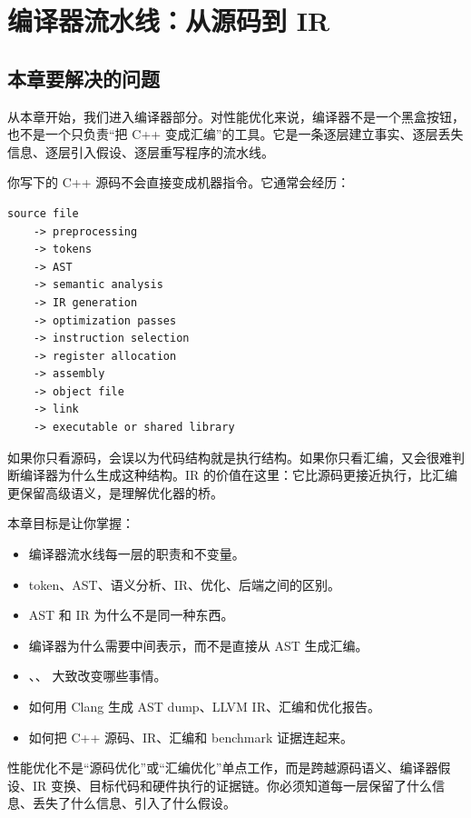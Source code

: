 \section{编译器流水线：从源码到 IR}

\subsection{本章要解决的问题}

从本章开始，我们进入编译器部分。对性能优化来说，编译器不是一个黑盒按钮，也不是一个只负责“把 C++ 变成汇编”的工具。它是一条逐层建立事实、逐层丢失信息、逐层引入假设、逐层重写程序的流水线。

你写下的 C++ 源码不会直接变成机器指令。它通常会经历：

\begin{lstlisting}
source file
    -> preprocessing
    -> tokens
    -> AST
    -> semantic analysis
    -> IR generation
    -> optimization passes
    -> instruction selection
    -> register allocation
    -> assembly
    -> object file
    -> link
    -> executable or shared library
\end{lstlisting}

如果你只看源码，会误以为代码结构就是执行结构。如果你只看汇编，又会很难判断编译器为什么生成这种结构。IR 的价值在这里：它比源码更接近执行，比汇编更保留高级语义，是理解优化器的桥。

本章目标是让你掌握：

\begin{itemize}
  \item 编译器流水线每一层的职责和不变量。
  \item token、AST、语义分析、IR、优化、后端之间的区别。
  \item AST 和 IR 为什么不是同一种东西。
  \item 编译器为什么需要中间表示，而不是直接从 AST 生成汇编。
  \item {}、、 大致改变哪些事情。
  \item 如何用 Clang 生成 AST dump、LLVM IR、汇编和优化报告。
  \item 如何把 C++ 源码、IR、汇编和 benchmark 证据连起来。
\end{itemize}

\begin{keyidea}
性能优化不是“源码优化”或“汇编优化”单点工作，而是跨越源码语义、编译器假设、IR 变换、目标代码和硬件执行的证据链。你必须知道每一层保留了什么信息、丢失了什么信息、引入了什么假设。
\end{keyidea}

